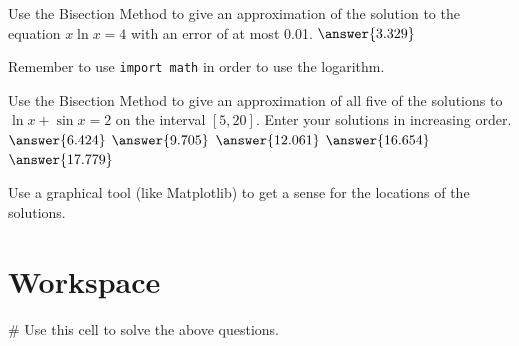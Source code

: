 \documentclass{ximera}
\begin{document}
\begin{question}
	Use the Bisection Method to give an approximation of the solution to the equation $x\ln{x}=4$ with an error of at most 0.01. $\answer{3.329}$
	\begin{hint}
		Remember to use \verb|import math| in order to use the logarithm.
	\end{hint}
\end{question}

\begin{question}
	Use the Bisection Method to give an approximation of all five of the solutions to $\ln{x}+\sin{x}=2$ on the interval $[5,20]$. Enter your solutions in increasing order. $\answer{6.424}$ $\answer{9.705}$ $\answer{12.061}$ $\answer{16.654}$ $\answer{17.779}$
	\begin{hint}
		Use a graphical tool (like Matplotlib) to get a sense for the locations of the solutions.
	\end{hint}
\end{question}

\section{Workspace}

\begin{sageCell}
# Use this cell to solve the above questions.
\end{sageCell}
\end{document}
